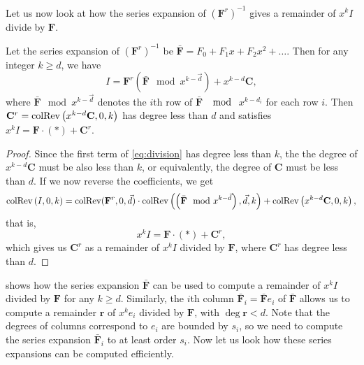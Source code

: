 Let us now look at how the series expansion of $\left(\mathbf{F}^{r}\right)^{-1}$
gives a remainder of $x^{k}I$ divide by $\mathbf{F}$.
\begin{lem}
\label{lem:remainder}Let \textup{the series expansion of $\left(\mathbf{F}^{r}\right)^{-1}$
be }$\bar{\mathbf{F}}=F_{0}+F_{1}x+F_{2}x^{2}+\dots$. Then for any
integer $k\ge d$, we have 
\begin{equation}
I=\mathbf{F}^{r}\left(\bar{\mathbf{F}}\mod x^{k-\vec{d}}\right)+x^{k-d}\mathbf{C},\label{eq:division}
\end{equation}
where $\bar{\mathbf{F}}\mod x^{k-\vec{d}}$ denotes the $i$th row
of $\bar{\mathbf{F}}$ $\mod$ $x^{k-d_{i}}$ for each row $i$. Then
$\mathbf{C}^{r}=\operatorname{colRev}\left(x^{k-d}\mathbf{C},0,k\right)$ has degree
less than $d$ and satisfies \textup{$x^{k}I=\mathbf{F}\cdot\left(*\right)+\mathbf{C}^{r}$.}\end{lem}
\begin{proof}
Since the first term of \eqref{eq:division} has degree less than
$k$, the the degree of $x^{k-d}\mathbf{C}$ must be also less than
$k$, or equivalently, the degree of $\mathbf{C}$ must be less than
$d$. If we now reverse the coefficients, we get 
\[
\operatorname{colRev}\left(I,0,k\right)=\operatorname{colRev}(\mathbf{F}^{r},0,\vec{d})\cdot\operatorname{colRev}\left(\left(\bar{\mathbf{F}}\mod x^{k-\vec{d}}\right),\vec{d},k\right)+\operatorname{colRev}\left(x^{k-d}\mathbf{C},0,k\right),
\]
 that is, 
\[
x^{k}I=\mathbf{F}\cdot\left(*\right)+\mathbf{C}^{r},
\]
 which gives us $\mathbf{C}^{r}$ as a remainder of $x^{k}I$ divided
by $\mathbf{F}$, where $\mathbf{C}^{r}$ has degree less than $d$. 
\end{proof}
 shows how the series expansion $\bar{\mathbf{F}}$
can be used to compute a remainder of $x^{k}I$ divided by $\mathbf{F}$
for any $k\ge d$. Similarly, the $i$th column $\bar{\mathbf{F}}_{i}=\bar{\mathbf{F}}e_{i}$
of $\bar{\mathbf{F}}$ allows us to compute a remainder $\mathbf{r}$
of $x^{k}e_{i}$ divided by $\mathbf{F}$, with $\deg\mathbf{r}<d$.
Note that the degrees of columns correspond to $e_{i}$ are bounded
by $s_{i}$, so we need to compute the series expansion $\bar{\mathbf{F}}_{i}$
to at least order $s_{i}$. Now let us look how these series expansions
can be computed efficiently.


